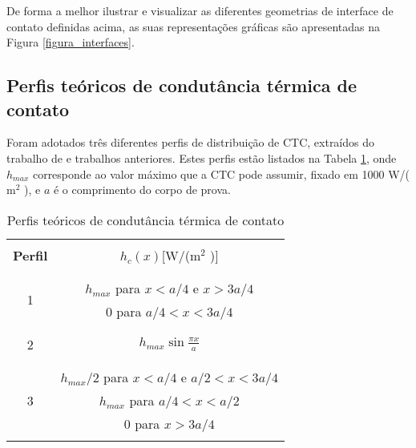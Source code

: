 De forma a melhor ilustrar e visualizar as diferentes geometrias de interface de contato definidas acima, as suas representações gráficas são apresentadas na Figura \ref{figura_interfaces}.



\subsection{Perfis teóricos de condutância térmica de contato}\label{config_ctc}

Foram adotados três diferentes perfis de distribuição de CTC, extraídos do trabalho de \cite{tese_padilha} e trabalhos anteriores. Estes perfis estão listados na Tabela \ref{tabela_ctc}, onde $h_{max}$ corresponde ao valor máximo que a CTC pode assumir, fixado em 1000 W/($\text{m}^2$ \celsius), e $a$ é o comprimento do corpo de prova.
\begin{table}[H]
	\centering
	\caption{Perfis teóricos de condutância térmica de contato}
		\begin{tabular}{c|c}
			\hline \\
			\textbf{Perfil} & $h_c(x)$[W/($\text{m}^2$ \celsius)]  \\ \\ \hline \\
			\multirow{2}{*}{1} & $h_{max}$ para $x < a/4$ e $x > 3a/4$ \\ & 0 para $a/4 < x < 3a/4$ \\ \\ \hline \\
			2 & $h_{max}\sin\displaystyle\frac{\pi x}{a}$ \\ \\ \hline \\
			\multirow{3}{*}{3} & $h_{max}/2$ para $x < a/4$ e $a/2 < x < 3a/4$ \\ & $h_{max}$ para $a/4 < x < a/2$ \\ & 0 para $ x > 3a/4$
			\\ \\ \hline
		\end{tabular}			
	\label{tabela_ctc}
\end{table}

